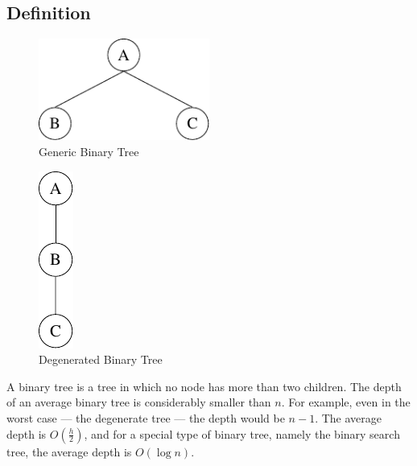 \subsection{Definition}
\begin{minipage}{0.5\textwidth}
  \begin{figure}[H]
    \centering
    \includegraphics[width=0.5\textwidth]{Figure/Generic-BT.pdf}
    \caption{Generic Binary Tree}
  \end{figure}
\end{minipage}
\begin{minipage}{0.5\textwidth}
  \begin{figure}[H]
    \centering
    \includegraphics[height=0.3\textwidth]{Figure/Degene-BT.pdf}
    \caption{Degenerated Binary Tree}
  \end{figure}
\end{minipage}

A binary tree is a tree in which no node has more than two children. The depth of an average binary tree is considerably smaller than \(n\). For example, even in the worst case — the degenerate tree — the depth would be \(n - 1\). The average depth is \(O(\frac{h}{2})\), and for a special type of binary tree, namely the binary search tree, the average depth is \(O(\log n)\).

